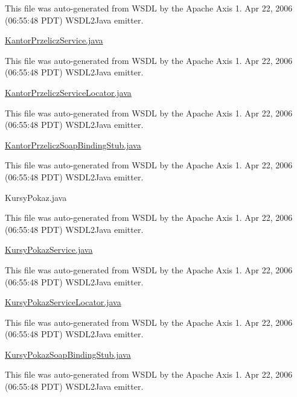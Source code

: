 This file was auto-\/generated from W\+S\+D\+L by the Apache Axis 1. Apr 22, 2006 (06\+:55\+:48 P\+D\+T) W\+S\+D\+L2\+Java emitter.

\hyperlink{_kantor_przelicz_service_8java}{Kantor\+Przelicz\+Service.\+java}

This file was auto-\/generated from W\+S\+D\+L by the Apache Axis 1. Apr 22, 2006 (06\+:55\+:48 P\+D\+T) W\+S\+D\+L2\+Java emitter.

\hyperlink{_kantor_przelicz_service_locator_8java}{Kantor\+Przelicz\+Service\+Locator.\+java}

This file was auto-\/generated from W\+S\+D\+L by the Apache Axis 1. Apr 22, 2006 (06\+:55\+:48 P\+D\+T) W\+S\+D\+L2\+Java emitter.

\hyperlink{_kantor_przelicz_soap_binding_stub_8java}{Kantor\+Przelicz\+Soap\+Binding\+Stub.\+java}

This file was auto-\/generated from W\+S\+D\+L by the Apache Axis 1. Apr 22, 2006 (06\+:55\+:48 P\+D\+T) W\+S\+D\+L2\+Java emitter.

Kursy\+Pokaz.\+java

This file was auto-\/generated from W\+S\+D\+L by the Apache Axis 1. Apr 22, 2006 (06\+:55\+:48 P\+D\+T) W\+S\+D\+L2\+Java emitter.

\hyperlink{_kursy_pokaz_service_8java}{Kursy\+Pokaz\+Service.\+java}

This file was auto-\/generated from W\+S\+D\+L by the Apache Axis 1. Apr 22, 2006 (06\+:55\+:48 P\+D\+T) W\+S\+D\+L2\+Java emitter.

\hyperlink{_kursy_pokaz_service_locator_8java}{Kursy\+Pokaz\+Service\+Locator.\+java}

This file was auto-\/generated from W\+S\+D\+L by the Apache Axis 1. Apr 22, 2006 (06\+:55\+:48 P\+D\+T) W\+S\+D\+L2\+Java emitter.

\hyperlink{_kursy_pokaz_soap_binding_stub_8java}{Kursy\+Pokaz\+Soap\+Binding\+Stub.\+java}

This file was auto-\/generated from W\+S\+D\+L by the Apache Axis 1. Apr 22, 2006 (06\+:55\+:48 P\+D\+T) W\+S\+D\+L2\+Java emitter. 